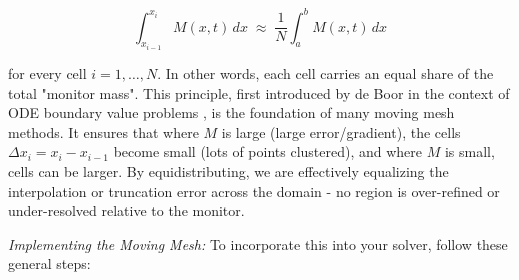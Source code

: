 \documentclass{adonis}
\begin{document}
$$ 
\int_{x_{i-1}}^{x_i} M(x,t)\,dx \;\approx\; \frac{1}{N} \int_{a}^{b} M(x,t)\,dx
$$ 

for every cell $i = 1,\dots,N$. In other words, each cell carries an equal share of the total "monitor mass". This principle, first introduced by de Boor in the context of ODE boundary value problems , is the foundation of many moving mesh methods. It ensures that where $M$ is large (large error/gradient), the cells $\Delta x_i = x_i - x_{i-1}$ become small (lots of points clustered), and where $M$ is small, cells can be larger. By equidistributing, we are effectively equalizing the interpolation or truncation error across the domain - no region is over-refined or under-resolved relative to the monitor. 

\textit{Implementing the Moving Mesh:} To incorporate this into your solver, follow these general steps: 
\end{document}
